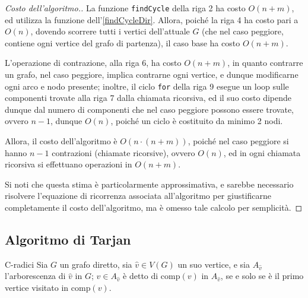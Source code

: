 \documentclass[a4paper, 12pt]{report}
\begin{document}
    \begin{proof}[Costo dell'algoritmo.]
        La funzione \texttt{findCycle} della riga 2 ha costo $O(n + m)$, ed utilizza la funzione dell'\cref{findCycleDir}. Allora, poiché la riga 4 ha costo pari a $O(n)$, dovendo scorrere tutti i vertici dell'attuale $G$ (che nel caso peggiore, contiene ogni vertice del grafo di partenza), il caso base ha costo $O(n+ m)$.

        L'operazione di contrazione, alla riga 6, ha costo $O(n+m)$, in quanto contrarre un grafo, nel caso peggiore, implica contrarne ogni vertice, e dunque modificarne ogni arco e nodo presente; inoltre, il ciclo \texttt{for} della riga 9 esegue un loop sulle componenti trovate alla riga 7 dalla chiamata ricorsiva, ed il suo costo dipende dunque dal numero di componenti che nel caso peggiore possono essere trovate, ovvero $n - 1$, dunque $O(n)$, poiché un ciclo è costituito da minimo 2 nodi.

        Allora, il costo dell'algoritmo è $O(n \cdot (n + m))$, poiché nel caso peggiore si hanno $n - 1$ contrazioni (chiamate ricorsive), ovvero $O(n)$, ed in ogni chiamata ricorsiva si effettuano operazioni in $O(n + m)$.

        Si noti che questa stima è particolarmente approssimativa, e sarebbe necessario risolvere l'equazione di ricorrenza associata all'algoritmo per giustificarne completamente il costo dell'algoritmo, ma è omesso tale calcolo per semplicità.
    \end{proof}

    \subsection{Algoritmo di Tarjan}

    \begin{frameddefn}{C-radici}
        Sia $G$ un grafo diretto, sia $\hat v \in V(G)$ un suo vertice, e sia $A_{\hat v}$ l'arborescenza di $\hat v$ in $G$; $v \in A_{\hat v}$ è detto  di $\mathrm{comp}(v)$ in $A_{\hat v}$, se e solo se è il primo vertice visitato in $\mathrm{comp}(v)$.
    \end{frameddefn}
\end{document}
